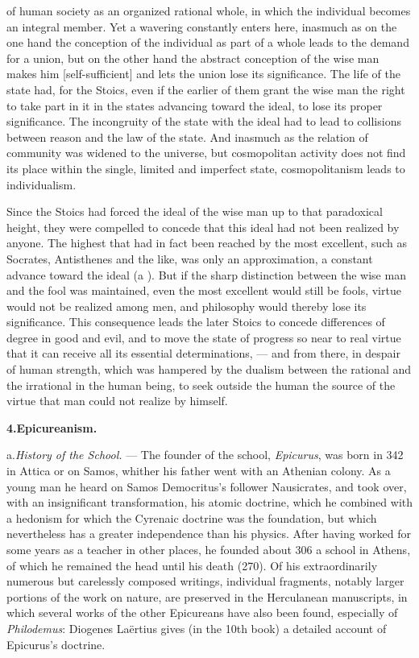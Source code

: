 of human society as an organized rational whole, in which the individual
becomes an integral member. Yet a wavering constantly enters here,
inasmuch as on the one hand the conception of the individual as part of a
whole leads to the demand for a union, but on the other hand the abstract
conception of the wise man makes him  [self-sufficient] and
lets the union lose its significance. The life of the state had, for the
Stoics, even if the earlier of them grant the wise man the
right to take part in it in the states advancing toward the ideal, to
lose its proper significance. The incongruity of the state with the
ideal had to lead to collisions between reason and the law of the state.
And inasmuch as the relation of community was widened to the universe,
but cosmopolitan activity does not find its place within the single,
limited and imperfect state, cosmopolitanism leads to individualism.

Since the Stoics had forced the ideal of the wise man up to that
paradoxical height, they were compelled to concede that this ideal had
not been realized by anyone. The highest that had in fact been reached by
the most excellent, such as Socrates, Antisthenes and the like, was only
an approximation, a constant advance toward the ideal (a ).
But if the sharp distinction between the wise man and the fool was
maintained, even the most excellent would still be fools, virtue would
not be realized among men, and philosophy would thereby lose its
significance. This consequence leads the later Stoics to concede
differences of degree in good and evil, and to move the state of
progress so near to real virtue that it can receive all its essential
determinations, --- and from there, in despair of human strength, which
was hampered by the dualism between the rational and the irrational in
the human being, to seek outside the human the source of the virtue that
man could not realize by himself.

\divrule

\begin{center}
\textbf{4.\enspace Epicureanism.}
\end{center}

a.\enspace \emph{History of the School.} --- The founder of the school,
\emph{Epicurus}, was born in 342 in Attica or on Samos, whither his
father went with an Athenian colony. As a young man he heard on Samos
Democritus's follower Nausicrates, and took over, with an insignificant
transformation, his atomic doctrine, which he combined with a hedonism
for which the Cyrenaic doctrine was the foundation, but which
nevertheless has a greater independence than his physics.
After having worked for some years as a teacher in other
places, he founded about 306 a school in Athens, of which he remained
the head until his death (270). Of his extraordinarily numerous but
carelessly composed writings, individual fragments, notably larger
portions of the work on nature, are preserved in the Herculanean
manuscripts, in which several works of the other Epicureans have also
been found, especially of \emph{Philodemus}: Diogenes Laërtius gives (in
the 10th book) a detailed account of Epicurus's doctrine.

